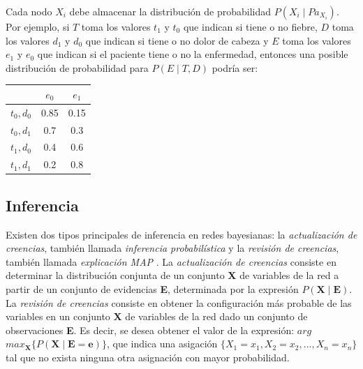 Cada nodo $X_i$ debe almacenar la distribución de probabilidad $P(X_i \mid Pa_{X_i})$. Por ejemplo, si $T$ toma los valores $t_1$ y $t_0$ que indican si tiene o no fiebre, $D$ toma los valores $d_1$ y $d_0$ que indican si tiene o no dolor de cabeza y $E$ toma los valores $e_1$ y $e_0$ que indican si el paciente tiene o no la enfermedad, entonces una posible distribución de probabilidad para $P(E \mid T,D)$ podría ser:

\begin{center}
	\begin{tabular}{|c|c|c|}
		\hline 
		& $e_0$ & $e_1$ \\ 
		\hline 
		$t_0,d_0$ & 0.85 & 0.15 \\ 
		\hline 
		$t_0,d_1$ & 0.7 & 0.3 \\ 
		\hline 
		$t_1,d_0$ & 0.4 & 0.6 \\ 
		\hline 
		$t_1,d_1$ & 0.2 & 0.8 \\ 
		\hline 
	\end{tabular}		
\end{center}

\subsection{Inferencia}
Existen dos tipos principales de inferencia en redes bayesianas: la \textit{actualización de creencias}, también llamada \textit{inferencia probabilística} y la \textit{revisión de creencias}, también llamada \textit{explicación MAP}\cite{10.5555/534975} \cite{guo2002survey}.	La \textit{actualización de creencias} consiste en determinar la distribución conjunta de un conjunto \textbf{X} de variables de la red a partir de un conjunto de evidencias \textbf{E}, determinada por la expresión $P(\textbf{X} \mid \textbf{E})$. La \textit{revisión de creencias} consiste en obtener la configuración más probable de las variables en un conjunto \textbf{X} de variables de la red dado un conjunto de observaciones \textbf{E}. Es decir, se desea obtener el valor de la expresión: $arg$ $max_{\textbf{X}}\{P(\textbf{X}\mid \textbf{E}=\textbf{e})\}$, que indica una asigación $\{X_1=x_1,X_2=x_2,...,X_n=x_n\}$ tal que no exista ninguna otra asignación con mayor probabilidad.

